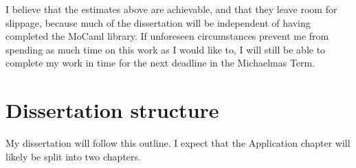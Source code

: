 \documentclass[proposal]{softeng}
\begin{document}
I believe that the estimates above are achievable, and that they leave
room for slippage, because much of the dissertation will be
independent of having completed the MoCaml library. If unforeseen
circumstances prevent me from spending as much time on this work as I
would like to, I will still be able to complete my work in time for
the next deadline in the Michaelmas Term.

\section{Dissertation structure}


My dissertation will follow this outline. I expect that the
Application chapter will likely be split into two chapters.
\end{document}
